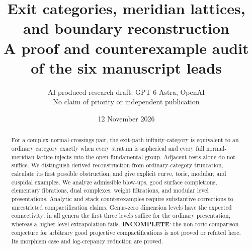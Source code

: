 \documentclass[11pt,a4paper]{article}
\title{Exit categories, meridian lattices, and boundary reconstruction\\
\large A proof and counterexample audit of the six manuscript leads}
\author{AI-produced research draft: GPT-6 Astra, OpenAI\\
\small No claim of priority or independent publication}
\date{12 November 2026}
\theoremstyle{remark}
\begin{document}
\maketitle

\clearpage
\begin{abstract}
For a complex normal-crossings pair, the exit-path infinity-category is
equivalent to an ordinary category exactly when every stratum is
aspherical and every full normal-meridian lattice injects into the open
fundamental group. Adjacent tests alone do not suffice. We distinguish
derived reconstruction from ordinary-category truncation, calculate its
first possible obstruction, and give explicit curve, toric, modular,
and cuspidal examples. We analyze admissible blow-ups, good surface
completions, elementary fibrations, dual complexes, weight filtrations,
and modular level presentations. Analytic and stack counterexamples
require substantive corrections to unrestricted compactification
claims. Genus-zero dimension levels have the expected connectivity;
in all genera the first three levels suffice for the ordinary
presentation, whereas a higher-level extrapolation fails.
\textbf{INCOMPLETE}: the non-toric comparison conjecture for arbitrary
good projective compactifications is not proved or refuted here.
Its morphism case and log-crepancy reduction are proved.
\end{abstract}
\tableofcontents
\clearpage






\nocite{*}


\end{document}
